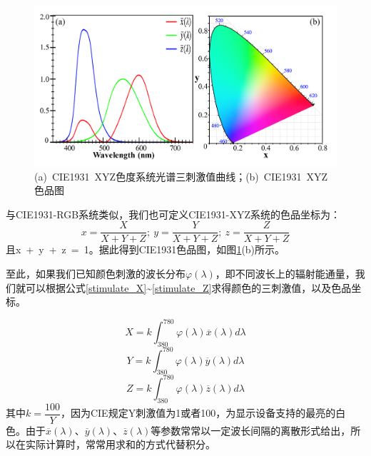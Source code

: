 \begin{figure}[htb]
	\centering
	\includegraphics[width=16cm]{./Pictures/color_xyz_combined.jpg}
	\captionsetup{justification=centering}
	\caption{(a)~CIE1931~XYZ色度系统光谱三刺激值曲线；(b)~CIE1931~XYZ色品图\cite{wikicie1931}}
	\label{color_xyz_combined}
\end{figure}

与CIE1931-RGB系统类似，我们也可定义CIE1931-XYZ系统的色品坐标为：
\begin{equation}
\label{sepin_XYZ}
x=\dfrac{X}{X+Y+Z};~y=\dfrac{Y}{X+Y+Z};~z=\dfrac{Z}{X+Y+Z}
\end{equation}
且x~+~y~+~z~=~1。据此得到CIE1931色品图，如图\ref{color_xyz_combined}(b)所示。


至此，如果我们已知颜色刺激的波长分布$\varphi(\lambda)$，即不同波长上的辐射能通量，我们就可以根据公式\ref{stimulate_X}\~{}\ref{stimulate_Z}求得颜色的三刺激值，以及色品坐标。

\begin{equation}
\label{stimulate_X}
X=k\int_{380}^{780}\varphi(\lambda)\overline{x}(\lambda)d\lambda
\end{equation}
\begin{equation}
\label{stimulate_Y}
Y=k\int_{380}^{780}\varphi(\lambda)\overline{y}(\lambda)d\lambda
\end{equation}
\begin{equation}
\label{stimulate_Z}
Z=k\int_{380}^{780}\varphi(\lambda)\overline{z}(\lambda)d\lambda
\end{equation}
其中$k=\dfrac{100}{Y}$，因为CIE规定Y刺激值为1或者100，为显示设备支持的最亮的白色。由于$\overline{x}(\lambda)$、$\overline{y}(\lambda)$、$\overline{z}(\lambda)$等参数常常以一定波长间隔的离散形式给出，所以在实际计算时，常常用求和的方式代替积分。

